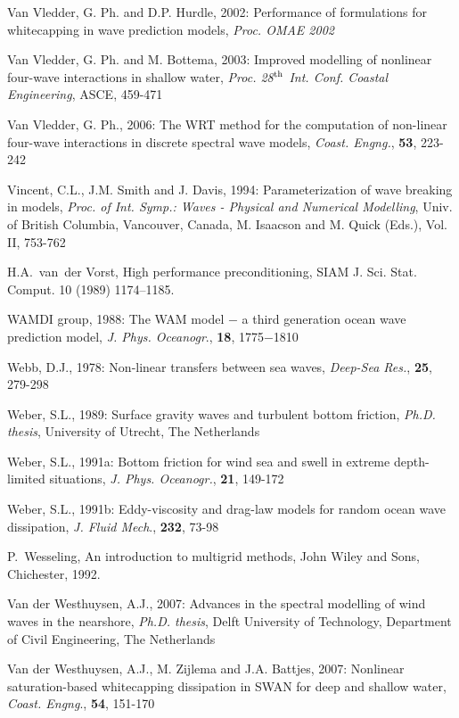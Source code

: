 \documentclass[12pt]{book}
\begin{document}
\begin{thebibliography}{10}
Van Vledder, G. Ph. and D.P. Hurdle, 2002: Performance of formulations for whitecapping in wave
prediction models, {\it Proc. OMAE 2002}

Van Vledder, G. Ph. and M. Bottema, 2003: Improved modelling of nonlinear four-wave interactions
in shallow water, {\it Proc. 28$^{{\rm th}}$ Int. Conf. Coastal Engineering}, ASCE, 459-471

Van Vledder, G. Ph., 2006: The {WRT} method for the computation of non-linear four-wave interactions in
discrete spectral wave models, {\it Coast. Engng.}, {\bf 53}, 223-242

Vincent, C.L., J.M. Smith and J. Davis, 1994: Parameterization of wave breaking in  models, {\it Proc. of Int.
Symp.: Waves - Physical and Numerical Modelling}, Univ. of British Columbia, Vancouver,
Canada, M. Isaacson and M. Quick (Eds.), Vol. II, 753-762

H.A.~van~der Vorst, High performance preconditioning, SIAM J. Sci. Stat. Comput.
  10 (1989) 1174--1185.

WAMDI group, 1988: The WAM model $-$ a third generation ocean wave prediction model, {\it J. Phys.
Oceanogr}., {\bf 18}, 1775$-$1810

Webb, D.J., 1978: Non-linear transfers between sea waves, {\it Deep-Sea Res.}, {\bf 25}, 279-298

Weber, S.L., 1989: Surface gravity waves and turbulent bottom friction, {\it Ph.D. thesis}, University of Utrecht,
The Netherlands

Weber, S.L., 1991a: Bottom friction for wind sea and swell in extreme depth-limited situations, {\it J. Phys.
Oceanogr.}, {\bf 21}, 149-172

Weber, S.L., 1991b: Eddy-viscosity and drag-law models for random ocean wave dissipation, {\it J. Fluid
Mech}., {\bf 232}, 73-98

P.~Wesseling, An introduction to multigrid methods, John Wiley and Sons,
  Chichester, 1992.

Van der Westhuysen, A.J., 2007: Advances in the spectral modelling of wind waves in the nearshore, {\it Ph.D. thesis},
Delft University of Technology, Department of Civil Engineering, The Netherlands

Van der Westhuysen, A.J., M. Zijlema and J.A. Battjes, 2007: Nonlinear saturation-based whitecapping dissipation
in SWAN for deep and shallow water, {\it Coast. Engng}., {\bf 54}, 151-170


\end{thebibliography}
\end{document}

